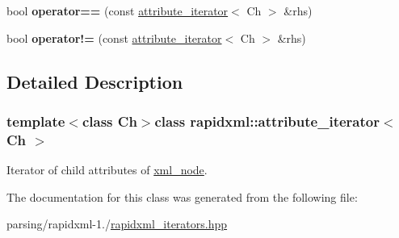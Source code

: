 \begin{DoxyCompactItemize}
\item 
\hypertarget{classrapidxml_1_1attribute__iterator_ab1dc8dd11d21e145a4e3f76d46aead0d}{bool {\bfseries operator==} (const \hyperlink{classrapidxml_1_1attribute__iterator}{attribute\-\_\-iterator}$<$ Ch $>$ \&rhs)}\label{classrapidxml_1_1attribute__iterator_ab1dc8dd11d21e145a4e3f76d46aead0d}

\item 
\hypertarget{classrapidxml_1_1attribute__iterator_a39e8cf336c324521fd9c720abf280d88}{bool {\bfseries operator!=} (const \hyperlink{classrapidxml_1_1attribute__iterator}{attribute\-\_\-iterator}$<$ Ch $>$ \&rhs)}\label{classrapidxml_1_1attribute__iterator_a39e8cf336c324521fd9c720abf280d88}

\end{DoxyCompactItemize}


\subsection{Detailed Description}
\subsubsection*{template$<$class Ch$>$class rapidxml\-::attribute\-\_\-iterator$<$ Ch $>$}

Iterator of child attributes of \hyperlink{classrapidxml_1_1xml__node}{xml\-\_\-node}. 

The documentation for this class was generated from the following file\-:\begin{DoxyCompactItemize}
\item 
parsing/rapidxml-\/1./\hyperlink{rapidxml__iterators_8hpp}{rapidxml\-\_\-iterators.\-hpp}\end{DoxyCompactItemize}
